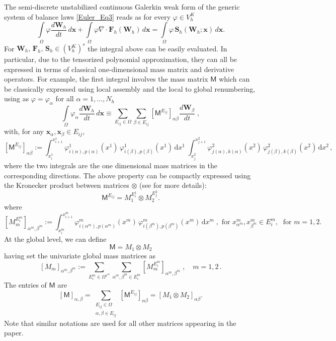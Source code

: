 \documentclass[a4paper,10pt]{article}
\begin{document}
The  semi-discrete unstabilized continuous Galerkin weak form of the  generic system of balance laws  \eqref{Euler_Eq3} reads as  for every $\varphi \in V^K_h$
\begin{equation}\label{eq:weakG0}
\int\limits_{\Omega}\varphi \dfrac{d\mathbf{W}_h}{dt}\,d\mathbf{x} + 
\int\limits_{\Omega}\varphi \nabla\cdot  \mathbf{F}_h(\mathbf{W}_h)\,d\mathbf{x}=
\int\limits_{\Omega}\varphi \, \mathbf{S}_h(\mathbf{W}_h;\mathbf{x})\,d\mathbf{x}.
\end{equation}
For    $\mathbf{W}_h,\, \mathbf{F}_h,\,  \mathbf{S}_h \in (V^K_h)^s$   the integral above can be easily evaluated.
In particular, due to the tensorized polynomial approximation, they can all be 
expressed in terms  of classical one-dimensional mass matrix and derivative operators.
For example, the first integral involves the mass matrix $\mathsf{M}$ which can be classically expressed using local assembly and  the local to global renumbering, using as $\varphi = \varphi_\alpha$ for all $\alpha = 1,\dots, N_h$
 $$
 \int\limits_{\Omega}\varphi_\alpha \dfrac{d\mathbf{W}_h}{dt}\,d\mathbf{x} \equiv
  \sum\limits_{E_{ij}\in\Omega}  \sum\limits_{\beta \in E_{ij}}    [\mathsf{M}^{E_{ij}}]_{\alpha\beta}\dfrac{d\mathbf{W}_{\beta}}{dt}\;, 
  $$
  with, for any $\mathbf{x}_{\alpha},\mathbf{x}_{\beta}\in E_{ij}$,
  $$
   [\mathsf{M}^{E_{ij}}]_{\alpha\beta}:=
 \int_{x^1_{i}}^{x^1_{i+1}} \!\!\varphi^1_{i(\alpha),p(\alpha)}\!(x^1)\, \varphi^1_{i(\beta),p(\beta)}\!(x^1)\,\mathrm{d}x^1  \;
  \int_{x^2_{j}}^{x^2_{j+1}}\!\! \varphi^2_{j(\alpha),k(\alpha)}\!(x^2)\, \varphi^2_{j(\beta),k(\beta)}\!(x^2)\,\mathrm{d}x^2  \,, 
 $$ 
where the two integrals are the one dimensional mass matrices in the corresponding directions.
The above property can be compactly expressed using the Kronecker product between matrices $\otimes$ (see \cite{barsukow2025structure}  for more details):
$$
\mathsf{M}^{E_{ij}} = M_1^{E_i^{1}}\otimes  M_2^{E_j^{2}}.
$$
where 
$$
[M_m^{E_i^{m}}]_{\alpha^m,\beta^m} :=   \int_{x^m_{i}}^{x^m_{i+1}} \!\!\varphi^m_{i(\alpha^m),p(\alpha^m)}\!(x^m)\, \varphi^m_{i(\beta^m),p(\beta^m)}\!(x^m)\,\mathrm{d}x^m\;, \text{ for }x^m_{\alpha^m}, x^m_{\beta^m} \in E_i^{m}, \; \text{ for }m=1,2.
$$
At the global level, we can define
$$
\mathsf{M}=   M_1\otimes  M_2 %
$$
having set the univariate global mass matrices as
$$
[M_m]_{\alpha^m,\beta^m} := \sum\limits_{E_i^{m} \in\Omega^{x^m}} \sum_{\alpha^m,\beta^m \in E^m_i} \left[ M_m^{E_i^{m}} \right]_{\alpha^m,\beta^m}\;,\quad m=1,2\,.
$$
The entries of $\mathsf{M}$ are
$$
[\mathsf{M}]_{\alpha, \beta}=   \sum\limits_{\substack{E_{ij}\in\Omega\\\alpha,\beta\in E_{ij}}}  [\mathsf{M}^{E_{ij}}]_{\alpha \beta} = [M_1\otimes  M_2]_{\alpha  \beta}. %
$$
Note that similar notations are used for all other matrices appearing in the paper.
\end{document}
